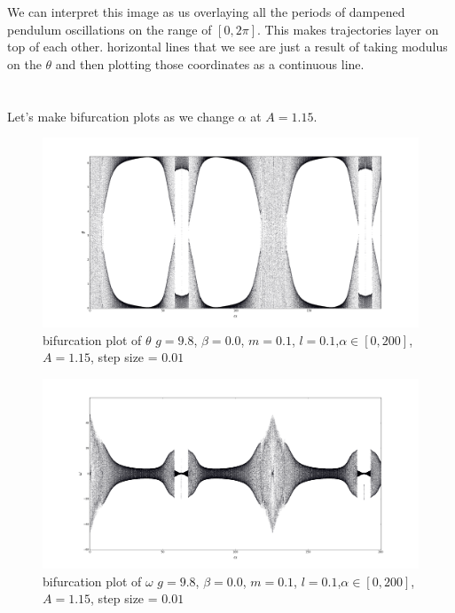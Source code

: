 \documentclass[12pt]{article}\pagestyle{myheadings}
\theoremstyle{plain}
\begin{document}
We can interpret this image as us overlaying all the periods of dampened pendulum oscillations on the range of $[0, 2\pi]$. This makes trajectories layer on top of each other. horizontal lines that we see are just a result of taking modulus on the $\theta$ and then plotting those coordinates as a continuous line. 

\section{}

Let's make bifurcation plots as we change $\alpha$ at $A = 1.15$.

\begin{figure}[H]
\centering
\includegraphics[scale=.25]{6_theta}
\caption{bifurcation plot of $\theta$  $g = 9.8$, $\beta = 0.0$, $m = 0.1$, $l = 0.1$,$\alpha \in [0,200]$, $A = 1.15$, step size = $0.01$}
\label{fig:my_label}
\end{figure}

\begin{figure}[H]
\centering
\includegraphics[scale=.25]{6_omega}
\caption{bifurcation plot of $\omega$  $g = 9.8$, $\beta = 0.0$, $m = 0.1$, $l = 0.1$,$\alpha \in [0,200]$, $A = 1.15$, step size = $0.01$}
\label{fig:my_label}
\end{figure}
\end{document}
